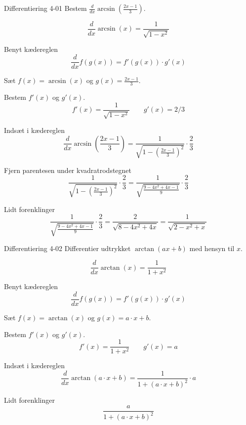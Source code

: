 \documentclass{article}
\begin{document}
\tableofcontents
\newpage


\begin{exercise}{Differentiering 4-01}
Bestem $\frac{d}{dx} \arcsin\left( \frac{2x - 1}{3} \right)$.



\hint
\[
\frac{d}{dx} \arcsin(x) = \frac{1}{\sqrt{1 - x^ 2}}
\]


\hint
Benyt kædereglen
\[
\frac{d}{dx} f(g(x)) = f'(g(x)) \cdot g'(x)
\]

\hint
Sæt $f(x) = \arcsin(x)$ og $g(x) = \frac{2x - 1}{3}$.

\hint
Bestem $f'(x)$ og $g'(x)$.
\[
f'(x) = \frac{1}{\sqrt{1 - x^ 2}} \qquad g'(x) = 2/3
\]

\hint
Indsæt i kædereglen
\[
\frac{d}{dx} \arcsin\left( \frac{2x - 1}{3} \right) = \frac{1}{\sqrt{1 - \left( \frac{2x - 1}{3} \right)^ 2}} \cdot \frac{2}{3}
\]

\hint
Fjern parentesen under kvadratrodstegnet
\[
\frac{1}{\sqrt{1 - \left( \frac{2x - 1}{3} \right)^ 2}} \cdot \frac{2}{3}
= \frac{1}{\sqrt{\frac{9 - 4x^2 + 4x - 1}{9}}} \cdot \frac{2}{3}
\]

\hint
Lidt forenklinger
\[
\frac{1}{\sqrt{\frac{9 - 4x^2 + 4x - 1}{9}}} \cdot \frac{2}{3}
= \frac{2}{\sqrt{8 - 4x^2 + 4x}}
= \frac{1}{\sqrt{2 - x^2 + x}}
\]
\end{exercise}

\begin{exercise}{Differentiering 4-02}
Differentier udtrykket $\arctan\left( a x + b \right)$ med hensyn til $x$.


\hint
\[
\frac{d}{dx} \arctan(x) = \frac{1}{1 + x^ 2}
\]


\hint
Benyt kædereglen
\[
\frac{d}{dx} f(g(x)) = f'(g(x)) \cdot g'(x)
\]

\hint
Sæt $f(x) = \arctan(x)$ og $g(x) = a \cdot x + b$.

\hint
Bestem $f'(x)$ og $g'(x)$.
\[
f'(x) = \frac{1}{1 + x^ 2} \qquad g'(x) = a
\]

\hint
Indsæt i kædereglen
\[
\frac{d}{dx} \arctan\left( a \cdot x + b \right) = \frac{1}{1 + \left( a \cdot x + b \right)^2} \cdot a
\]

\hint
Lidt forenklinger
\[
\frac{a}{1 + \left( a \cdot x + b \right)^2}
\]
\end{exercise}
\end{document}

